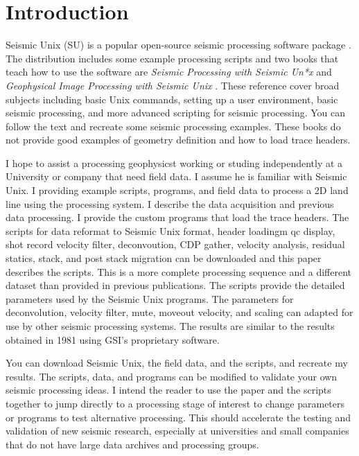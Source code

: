 \section{Introduction}
Seismic Unix (SU) is a popular open-source seismic processing software
package \cite[]{TLE16-07-10451049,cohen}.  The distribution
includes some example processing scripts and two books that
teach how to use the software are \emph{Seismic Processing with Seismic
  Un*x} \cite[]{forel} and \emph{Geophysical Image Processing with
  Seismic Unix} \cite[]{stockwell} .  These reference cover broad
subjects including basic Unix commands, setting up a user environment,
basic seismic processing, and more advanced scripting for seismic
processing.  You can follow the text and recreate some seismic
processing examples.  These books do not provide good examples of 
geometry definition and how to load trace headers.\nocite{cohen}

I hope to assist a processing geophysicst working or studing independently 
at a University or company that need field data.  I assume he is familiar 
with Seismic Unix.  I providing example scripts,  programs, and field data 
to process a 2D land line using the processing system. I describe the data 
acquisition and previous data processing.  I provide the custom programs 
that load the trace headers.  The scripts for data reformat to Seismic 
Unix format, header loadingm qc display, shot record velocity filter, 
deconvoution, CDP gather, velocity analysis, residual statics, stack, 
and post stack migration can be downloaded and this paper describes 
the scripts.  This is a more complete processing sequence and a 
different dataset than provided in previous publications.  The scripts 
provide the detailed parameters used by the Seismic Unix programs.  The 
parameters for deconvolution, velocity filter, mute, moveout velocity, 
and scaling can adapted for use by other seismic processing  systems. The 
results are similar to the results obtained in 1981 using GSI's proprietary 
software.  

You can download Seismic Unix, the field data, and the scripts, and 
recreate my results.  The scripts, data, and programs can be modified 
to validate your own seismic processing ideas.  I intend the reader to 
use the paper and the scripts together to jump directly to a processing 
stage of interest to change parameters or programs to test alternative 
processing.  This should accelerate the testing and validation 
of new seismic research, especially at universities and small companies that 
do not have large data archives and processing groups.

